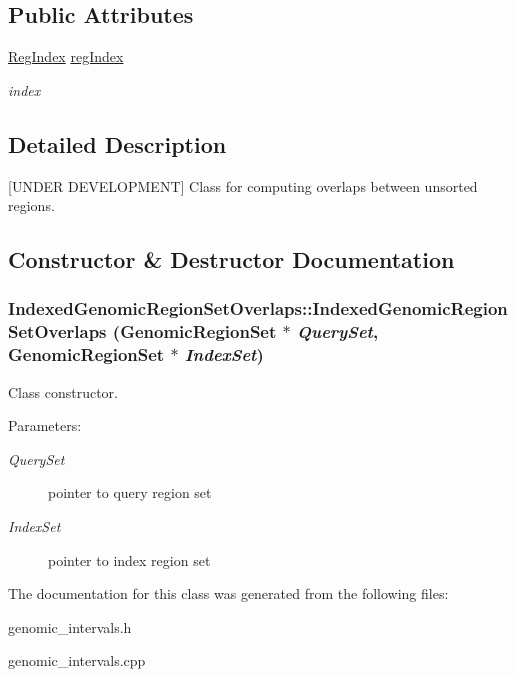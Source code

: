 \subsection*{Public Attributes}
\begin{CompactItemize}
\item 
\hypertarget{classIndexedGenomicRegionSetOverlaps_a3906a9bbc5975845bf8eadb02510104}{
\hyperlink{classIndexedGenomicRegionSetOverlaps_de47ae96555af24f64698fe743a6436c}{RegIndex} \hyperlink{classIndexedGenomicRegionSetOverlaps_a3906a9bbc5975845bf8eadb02510104}{regIndex}}
\label{classIndexedGenomicRegionSetOverlaps_a3906a9bbc5975845bf8eadb02510104}

\begin{CompactList}\small\item\em index \item\end{CompactList}\end{CompactItemize}


\subsection{Detailed Description}
\mbox{[}UNDER DEVELOPMENT\mbox{]} Class for computing overlaps between unsorted regions. 

\subsection{Constructor \& Destructor Documentation}
\hypertarget{classIndexedGenomicRegionSetOverlaps_54b230481fa7970eaf8c04efc8734f9e}{
\subsubsection[IndexedGenomicRegionSetOverlaps]{\setlength{\rightskip}{0pt plus 5cm}IndexedGenomicRegionSetOverlaps::IndexedGenomicRegionSetOverlaps ({\bf GenomicRegionSet} $\ast$ {\em QuerySet}, \/  {\bf GenomicRegionSet} $\ast$ {\em IndexSet})}}
\label{classIndexedGenomicRegionSetOverlaps_54b230481fa7970eaf8c04efc8734f9e}


Class constructor. 

\begin{Desc}
\item[Parameters:]
\begin{description}
\item[{\em QuerySet}]pointer to query region set \item[{\em IndexSet}]pointer to index region set \end{description}
\end{Desc}


The documentation for this class was generated from the following files:\begin{CompactItemize}
\item 
genomic\_\-intervals.h\item 
genomic\_\-intervals.cpp\end{CompactItemize}
